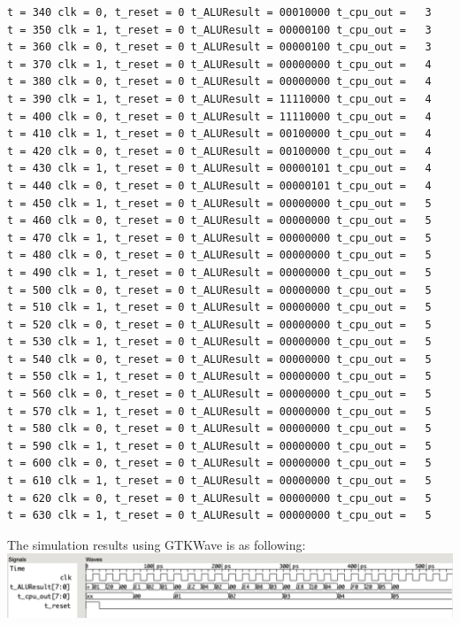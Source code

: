 \documentclass{article}
\begin{document}
\begin{Verbatim}[fontsize = \footnotesize]
t = 340 clk = 0, t_reset = 0 t_ALUResult = 00010000 t_cpu_out =   3
t = 350 clk = 1, t_reset = 0 t_ALUResult = 00000100 t_cpu_out =   3
t = 360 clk = 0, t_reset = 0 t_ALUResult = 00000100 t_cpu_out =   3
t = 370 clk = 1, t_reset = 0 t_ALUResult = 00000000 t_cpu_out =   4
t = 380 clk = 0, t_reset = 0 t_ALUResult = 00000000 t_cpu_out =   4
t = 390 clk = 1, t_reset = 0 t_ALUResult = 11110000 t_cpu_out =   4
t = 400 clk = 0, t_reset = 0 t_ALUResult = 11110000 t_cpu_out =   4
t = 410 clk = 1, t_reset = 0 t_ALUResult = 00100000 t_cpu_out =   4
t = 420 clk = 0, t_reset = 0 t_ALUResult = 00100000 t_cpu_out =   4
t = 430 clk = 1, t_reset = 0 t_ALUResult = 00000101 t_cpu_out =   4
t = 440 clk = 0, t_reset = 0 t_ALUResult = 00000101 t_cpu_out =   4
t = 450 clk = 1, t_reset = 0 t_ALUResult = 00000000 t_cpu_out =   5
t = 460 clk = 0, t_reset = 0 t_ALUResult = 00000000 t_cpu_out =   5
t = 470 clk = 1, t_reset = 0 t_ALUResult = 00000000 t_cpu_out =   5
t = 480 clk = 0, t_reset = 0 t_ALUResult = 00000000 t_cpu_out =   5
t = 490 clk = 1, t_reset = 0 t_ALUResult = 00000000 t_cpu_out =   5
t = 500 clk = 0, t_reset = 0 t_ALUResult = 00000000 t_cpu_out =   5
t = 510 clk = 1, t_reset = 0 t_ALUResult = 00000000 t_cpu_out =   5
t = 520 clk = 0, t_reset = 0 t_ALUResult = 00000000 t_cpu_out =   5
t = 530 clk = 1, t_reset = 0 t_ALUResult = 00000000 t_cpu_out =   5
t = 540 clk = 0, t_reset = 0 t_ALUResult = 00000000 t_cpu_out =   5
t = 550 clk = 1, t_reset = 0 t_ALUResult = 00000000 t_cpu_out =   5
t = 560 clk = 0, t_reset = 0 t_ALUResult = 00000000 t_cpu_out =   5
t = 570 clk = 1, t_reset = 0 t_ALUResult = 00000000 t_cpu_out =   5
t = 580 clk = 0, t_reset = 0 t_ALUResult = 00000000 t_cpu_out =   5
t = 590 clk = 1, t_reset = 0 t_ALUResult = 00000000 t_cpu_out =   5
t = 600 clk = 0, t_reset = 0 t_ALUResult = 00000000 t_cpu_out =   5
t = 610 clk = 1, t_reset = 0 t_ALUResult = 00000000 t_cpu_out =   5
t = 620 clk = 0, t_reset = 0 t_ALUResult = 00000000 t_cpu_out =   5
t = 630 clk = 1, t_reset = 0 t_ALUResult = 00000000 t_cpu_out =   5
\end{Verbatim}
The simulation results using GTKWave is as following:\vspace{5pt}\\
\includegraphics[width=\textwidth]{cpu.png}
\end{document}
